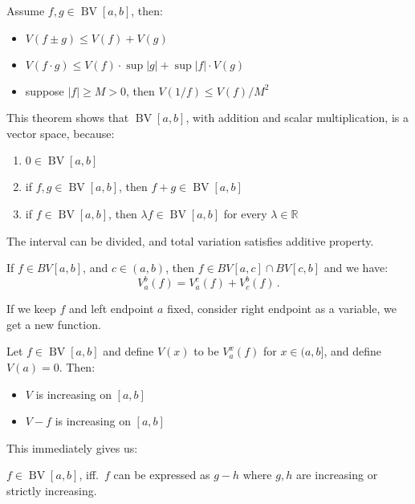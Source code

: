 \documentclass{article}
\newcommand{\R}{\mathbb R}
\DeclareMathOperator{\BV}{BV}
\begin{document}
\begin{theorem}
    Assume $ f, g \in \BV[a, b] $, then:
    \begin{itemize}
        \item $ V(f \pm g) \leqslant V(f) + V(g) $
        \item $ V(f \cdot g) \leqslant V(f) \cdot \sup|g| + \sup|f| \cdot V(g) $
        \item suppose $ |f| \geqslant M > 0 $, then $ V(1/f) \leqslant V(f) / M^2 $
    \end{itemize}
\end{theorem}

This theorem shows that $ \BV[a, b] $, with addition and scalar multiplication, is a vector space, because:
\begin{enumerate}
    \item $ 0 \in \BV[a, b] $
    \item if $ f, g \in \BV[a, b] $, then $ f + g \in \BV[a, b] $
    \item if $ f \in \BV[a, b] $, then $ \lambda f \in \BV[a, b] $ for every $ \lambda \in \R $
\end{enumerate}

The interval can be divided, and total variation satisfies additive property.
\begin{theorem}
    If $ f \in BV[a, b] $, and $ c \in (a, b) $, then $ f \in BV[a, c] \cap BV[c, b] $ and we have:
    \[ 
        V_a^b (f) = V_a^c (f) + V_c^b (f) \,.
    \]
\end{theorem}

If we keep $ f $ and left endpoint $ a $ fixed, consider right endpoint as a variable, we get a new function. 
\begin{theorem}
    Let $ f \in \BV[a, b] $ and define $ V(x) $ to be $ V_a^x (f) $ for $ x \in (a, b] $, and define $ V(a) = 0 $. Then:
    \begin{itemize}
        \item $ V $ is increasing on $ [a, b] $
        \item $ V - f $ is increasing on $ [a, b] $
    \end{itemize}
\end{theorem}

This immediately gives us:

\begin{theorem}
    $ f \in \BV[a, b] $, iff.\ $ f $ can be expressed as $ g - h $ where $ g, h $ are increasing or strictly increasing.
\end{theorem}
\end{document}
